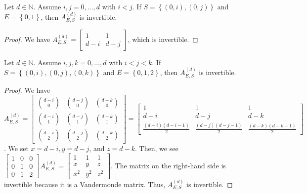 \begin{proposition}\label{prop:impossible-support-232423}
    Let \( d \in \mathbb{N} \). Assume \( i,j=0, \dots, d \) with \( i < j \). If \( S = \left\{ (0,i), (0,j) \right\} \) and \( E = \left\{ 0,1 \right\} \), then \( A^{(d)}_{E,S} \) is invertible.
\end{proposition}

\begin{proof}
    We have \( A^{(d)}_{E,S} = \begin{bmatrix}
        1 & 1 \\ d-i & d-j
    \end{bmatrix} \), which is invertible.
\end{proof}

\begin{proposition}\label{prop:impossible-support-2}
    Let \( d \in \mathbb{N} \). Assume \( i,j,k=0, \dots, d \) with \( i < j < k \). If \( S = \left\{ (0,i), (0,j), (0,k) \right\} \) and \( E = \left\{ 0,1,2 \right\} \), then \( A^{(d)}_{E,S} \) is invertible.
\end{proposition}

\begin{proof}
    We have  \( A^{(d)}_{E,S} = \begin{bmatrix}
        \binom{d-i}{0} & \binom{d-j}{0} & \binom{d-k}{0} \\
        \binom{d-i}{1} & \binom{d-j}{1} & \binom{d-k}{1} \\
        \binom{d-i}{2} & \binom{d-j}{2} & \binom{d-k}{2}
    \end{bmatrix} = \begin{bmatrix}
        1 & 1 & 1 \\
        d-i & d-j & d-k \\
        \frac{(d-i)(d-i-1)}{2} & \frac{(d-j)(d-j-1)}{2} & \frac{(d-k)(d-k-1)}{2}
    \end{bmatrix} \).
    We set \( x = d-i, y = d-j \), and \( z = d-k \).
    Then, we see \( \begin{bmatrix}
        1 & 0 & 0 \\
        0 & 1 & 0 \\
        0 & 1 & 2
    \end{bmatrix}A^{(d)}_{E,S} = \begin{bmatrix}
        1 & 1 & 1 \\
        x & y & z \\
        x^2 & y^2 & z^2
    \end{bmatrix} \).
    The matrix on the right-hand side is invertible because it is a Vandermonde matrix. Thus, \( A^{(d)}_{E,S} \) is invertible.
\end{proof}

